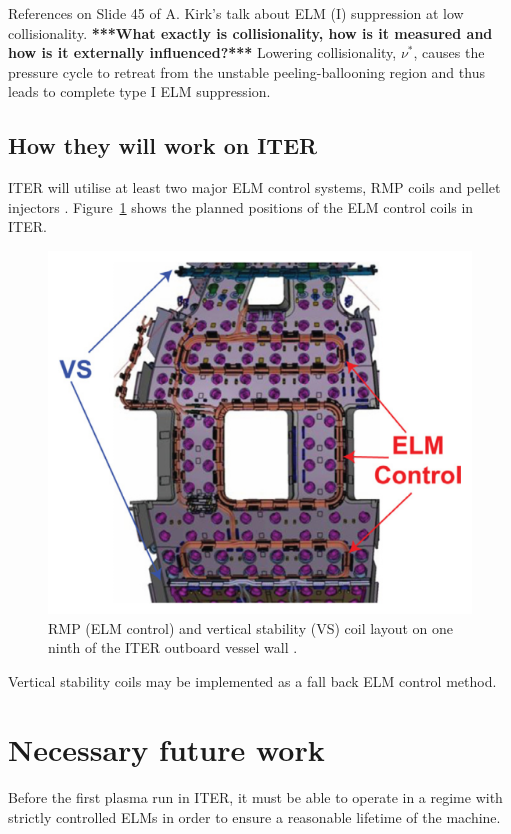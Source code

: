 \documentclass[12pt]{article}  %
\begin{document}
References on Slide 45 of A. Kirk's talk about ELM (I) suppression at low collisionality. \textbf{***What exactly is collisionality, how is it measured and how is it externally influenced?***} Lowering collisionality, $\nu^{*}$, causes the pressure cycle to retreat from the unstable peeling-ballooning region and thus leads to complete type I ELM suppression.\cite{Evans2008}


\subsection{How they will work on ITER}\label{ssec:onITER}
ITER will utilise at least two major ELM control systems, RMP coils and pellet injectors \cite{Loarte2010}. Figure~\ref{fig:ITERcoils} shows the planned positions of the ELM control coils in ITER.

\begin{figure}
\includegraphics[scale=0.5]{Figures/ITERcoils.png}
\centering
\caption{RMP (ELM control) and vertical stability (VS) coil layout on one ninth of the ITER outboard vessel wall \cite{Lang2013}.}\label{fig:ITERcoils}
\end{figure}

Vertical stability coils may be implemented as a fall back ELM control method.\cite{Loarte2014a}

\section{Necessary future work}\label{sec:Future}
Before the first plasma run in ITER, it must be able to operate in a regime with strictly controlled ELMs in order to ensure a reasonable lifetime of the machine. 
\end{document}
